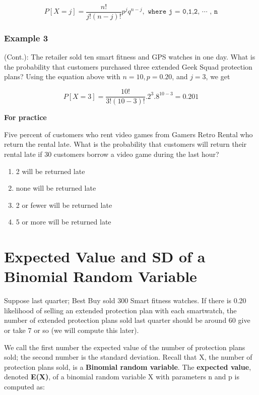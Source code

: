 \documentclass[11pt]{book}\usepackage[]{graphicx}\usepackage[]{color}
\begin{document}
\begin{equation*}
 P[ X = j] = \frac{n!}{j! (n - j)!} p^j q^{n - j}, \texttt{ where j = 0,1,2, $\cdots$ , n}
 \end{equation*}


\subsubsection{Example 3} (Cont.):  The retailer sold ten smart fitness and GPS watches in one day.  What is the probability that customers purchased three extended Geek Squad protection plans?  Using the equation above with $n = 10, p = 0.20$, and $j = 3$, we get

\begin{equation*}
 P[ X = 3] = \frac{10!}{3! (10 - 3)!} .2^3 .8^{10 - 3} = 0.201
 \end{equation*}

\begin{minipage}[ht]{29mm}

\textbf{For practice}
\end{minipage}
\begin{minipage}[ht]{119mm}

Five percent of customers who rent video games from Gamers Retro Rental who return the rental late.  What is the probability that customers will return their rental late if 30 customers borrow a video game during the last hour?

\begin{enumerate}
\item 2 will be returned late
\item none will be returned late
\item 2 or fewer will be returned late
\item 5 or more will be returned late
\end{enumerate}
\end{minipage}

\section{Expected Value and SD of a Binomial Random Variable}

Suppose last quarter; Best Buy sold 300 Smart fitness watches.  If there is 0.20 likelihood of selling an extended protection plan with each smartwatch, the number of extended protection plans sold last quarter should be around 60 give or take 7 or so (we will compute this later).

We call the first number the expected value of the number of protection plans sold; the second number is the standard deviation.  Recall that X, the number of protection plans sold, is a \textbf{Binomial random variable}.  The \textbf{expected value}, denoted \textbf{E(X)}, of a binomial random variable X with parameters n and p is computed as:
\end{document}

